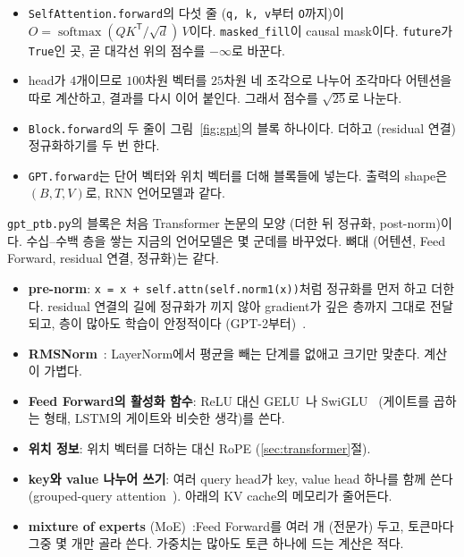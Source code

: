 \documentclass[11pt,a4paper]{article}
\newcommand{\figref}[1]{그림~\ref{fig:#1}}
\newcommand{\T}{^{\mathsf T}}
\newcommand{\softmax}{\operatorname{softmax}}
\begin{document}
\begin{itemize}[leftmargin=1.5em]
\item \texttt{SelfAttention.forward}의 다섯 줄 (\texttt{q, k, v}부터 \texttt{O}까지)이 $O=\softmax(QK\T/\sqrt d)\,V$이다.
\texttt{masked\_fill}이 causal mask이다. \texttt{future}가 \texttt{True}인 곳, 곧 대각선 위의 점수를 $-\infty$로 바꾼다.
\item head가 $4$개이므로 $100$차원 벡터를 $25$차원 네 조각으로 나누어 조각마다 어텐션을 따로 계산하고, 결과를 다시 이어 붙인다. 그래서 점수를 $\sqrt{25}$로 나눈다.
\item \texttt{Block.forward}의 두 줄이 \figref{gpt}의 블록 하나이다. 더하고 (residual 연결) 정규화하기를 두 번 한다.
\item \texttt{GPT.forward}는 단어 벡터와 위치 벡터를 더해 블록들에 넣는다. 출력의 shape은 $(B,T,V)$로, RNN 언어모델과 같다.
\end{itemize}

\begin{remarkbox}
\texttt{gpt\_ptb.py}의 블록은 처음 Transformer 논문의 모양 (더한 뒤 정규화, post-norm)이다. 수십--수백 층을 쌓는 지금의 언어모델은 몇 군데를 바꾸었다. 뼈대 (어텐션, Feed Forward, residual 연결, 정규화)는 같다.
\begin{itemize}[leftmargin=1.2em]
\item \textbf{pre-norm}: \texttt{x = x + self.attn(self.norm1(x))}처럼 정규화를 먼저 하고 더한다. residual 연결의 길에 정규화가 끼지 않아 gradient가 깊은 층까지 그대로 전달되고, 층이 많아도 학습이 안정적이다 (GPT-2부터)~\cite{radford2019,xiong2020}.
\item \textbf{RMSNorm}~\cite{zhang2019}: LayerNorm에서 평균을 빼는 단계를 없애고 크기만 맞춘다. 계산이 가볍다.
\item \textbf{Feed Forward의 활성화 함수}: ReLU 대신 GELU~\cite{hendrycks2016}나 SwiGLU~\cite{shazeer2020} (게이트를 곱하는 형태, LSTM의 게이트와 비슷한 생각)를 쓴다.
\item \textbf{위치 정보}: 위치 벡터를 더하는 대신 RoPE (\ref{sec:transformer}절).
\item \textbf{key와 value 나누어 쓰기}: 여러 query head가 key, value head 하나를 함께 쓴다 (grouped-query attention~\cite{ainslie2023}). 아래의 KV cache의 메모리가 줄어든다.
\item \textbf{mixture of experts} (MoE)~\cite{shazeer2017}:Feed Forward를 여러 개 (전문가) 두고, 토큰마다 그중 몇 개만 골라 쓴다. 가중치는 많아도 토큰 하나에 드는 계산은 적다.
\end{itemize}
\end{remarkbox}
\end{document}
